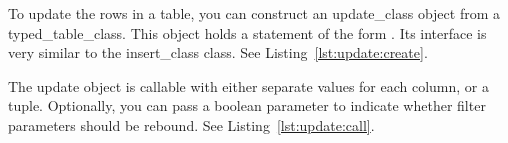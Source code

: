 To update the rows in a table, you can construct an \gls{update_class} object from a \gls{typed_table_class}. This object holds a statement of the form \newline{}. Its interface is very similar to the \gls{insert_class} class. See Listing~\ref{lst:update:create}.



The update object is callable with either separate values for each column, or a tuple. Optionally, you can pass a boolean parameter to indicate whether filter parameters should be rebound. See Listing~\ref{lst:update:call}.


